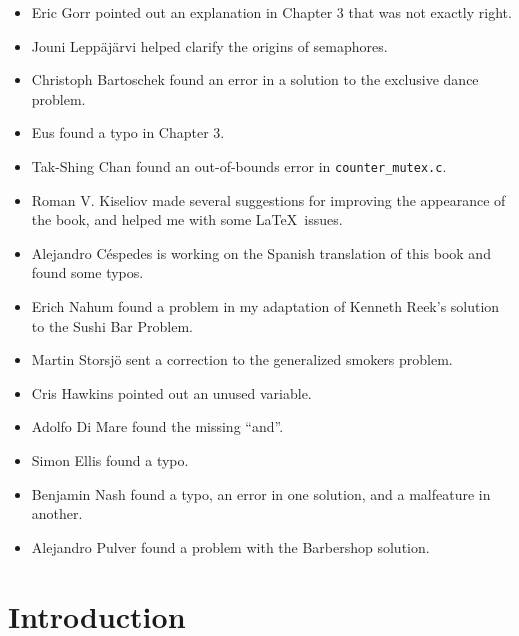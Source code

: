 \documentclass{book}
\newcommand{\clearemptydoublepage}{\newpage\cleardoublepage}
\begin{document}
\begin{itemize}
\item Eric Gorr pointed out an explanation in Chapter 3 that was
not exactly right.

\item Jouni Lepp\"{a}j\"{a}rvi helped clarify the origins of semaphores.

\item Christoph Bartoschek found an error in a solution to
the exclusive dance problem.

\item Eus found a typo in Chapter 3.

\item Tak-Shing Chan found an out-of-bounds error in {\tt counter\_mutex.c}.

\item Roman V. Kiseliov made several suggestions for improving
the appearance of the book, and helped me with some \LaTeX~issues.

\item Alejandro C\'{e}spedes is working on the Spanish translation of this
book and found some typos.

\item Erich Nahum found a problem in my adaptation of Kenneth Reek's
  solution to the Sushi Bar Problem.

\item Martin Storsj\"{o} sent a correction to the generalized smokers problem.

\item Cris Hawkins pointed out an unused variable.

\item Adolfo Di Mare found the missing ``and''.

\item Simon Ellis found a typo.

\item Benjamin Nash found a typo, an error in one solution, and
a malfeature in another.

\item Alejandro Pulver found a problem with the Barbershop solution.

\end{itemize}


\tableofcontents
\clearemptydoublepage

\mainmatter


\chapter{Introduction}
\end{document}
